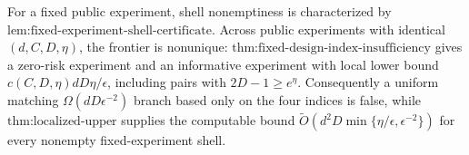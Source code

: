 For a fixed public experiment, shell nonemptiness is characterized by \(\text{lem:fixed-experiment-shell-certificate}\). Across public experiments with identical \((d,C,D,\eta)\), the frontier is nonunique: \(\text{thm:fixed-design-index-insufficiency}\) gives a zero-risk experiment and an informative experiment with local lower bound \(c(C,D,\eta)dD\eta/\epsilon\), including pairs with \(2D-1\ge e^\eta\). Consequently a uniform matching \(\Omega(dD\epsilon^{-2})\) branch based only on the four indices is false, while \(\text{thm:localized-upper}\) supplies the computable bound \(\widetilde O(d^2D\min\{\eta/\epsilon,\epsilon^{-2}\})\) for every nonempty fixed-experiment shell.